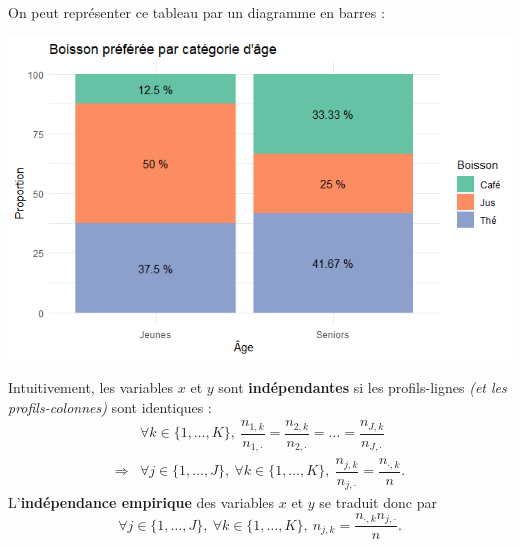 \documentclass[aspectratio=169,xcolor=dvipsnames]{beamer}
\begin{document}
\begin{frame}
\textcolor{nyubluedarker}{\faLightbulb[regular]} On peut représenter ce tableau par un diagramme en barres :

	\begin{center}
	\includegraphics[scale=0.7]{lien_quali_prop.png}
	\end{center}
\end{frame}

\begin{frame}
\textcolor{nyubluedarker}{\faLightbulb[regular]} Intuitivement, les variables $x$ et $y$ sont \textbf{indépendantes} si les profils-lignes \emph{(et les profils-colonnes)} sont identiques :
	\begin{align*}
	 & \forall k \in \{1,\ldots,K\}, \ \dfrac{n_{1,k}}{n_{1,\cdot}} = \dfrac{n_{2,k}}{n_{2,\cdot}}=\dots = \dfrac{n_{J,k}}{n_{J,\cdot}} \\
	\Longrightarrow & \forall j \in \{1,\ldots,J\}, \ \forall k \in \{1,\ldots,K\}, \ \dfrac{n_{j,k}}{n_{j,\cdot}}=\dfrac{n_{\cdot,k}}{n}.
	\end{align*}
\textcolor{nyubluedarker}{\faLightbulb[regular]} L'\textbf{indépendance empirique} des variables $x$ et $y$ se traduit donc par
	\[
	\boxed{\forall j \in \{1,\ldots,J\}, \ \forall k \in \{1,\ldots,K\}, \ n_{j,k} = \dfrac{n_{\cdot,k} n_{j,\cdot}}{n}.}
	\]
\end{frame}
\end{document}
